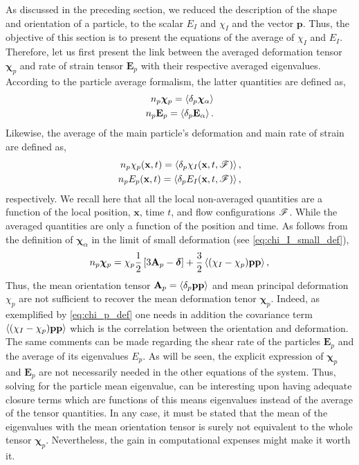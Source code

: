 As discussed in the preceding section, we reduced the description of the shape and orientation of a particle, to the scalar $E_I$ and $\chi_I$ and the vector $\textbf{p}$. 
Thus, the objective of this section is to present the equations of the average of $\chi_I$ and $E_I$. 
Therefore, let us first present the link between the averaged deformation tensor $\bm\chi_p$ and rate of strain tensor $\textbf{E}_p$ with their respective averaged eigenvalues.
According to the particle average formalism, the latter quantities are defined as,
\begin{align*}
    n_p \bm\chi_p = \left<\delta_p \bm\chi_\alpha\right>\\
    n_p \textbf{E}_p = \left<\delta_p \textbf{E}_\alpha\right>.
\end{align*}
Likewise, the average of the main particle's deformation and main rate of strain are defined as, 
\begin{align*}
    n_p \chi_p(\textbf{x},t) = \left<\delta_p \chi_I(\textbf{x},t,\mathscr{F})\right>,\\
    n_p E_p(\textbf{x},t) = \left<\delta_p E_I(\textbf{x},t,\mathscr{F})\right>,
\end{align*}
respectively. 
We recall here that all the local non-averaged quantities are a function of the local position, $\textbf{x}$, time $t$, and flow configurations $\mathscr{F}$. 
While the averaged quantities are only a function of the position and time. 
As follows from the definition of $\bm\chi_\alpha$ in the limit of small  deformation (see \ref{eq:chi_I_small_def}),  
\begin{equation}
    n_p \bm\chi_p
    = \chi_p
    \frac{1}{2}\left[
        3\textbf{A}_p 
        - \bm\delta
    \right]
    + \frac{3}{2}\avg{(\chi_I - \chi_p) \textbf{pp} }, 
    \label{eq:chi_p_def}
\end{equation}
Thus, the mean orientation tensor $\textbf{A}_p = \left<\delta_p \textbf{pp}\right>$ and mean principal deformation $\chi_p$ are not sufficient to recover the mean deformation tenor $\bm\chi_p$.
Indeed, as exemplified by \ref{eq:chi_p_def} one needs in addition the covariance term $\left<(\chi_I - \chi_p) \textbf{pp} \right>$ which is the correlation between the orientation and deformation. 
The same comments can be made regarding the shear rate of the particles $\textbf{E}_p$ and the average of its eigenvalues $E_p$. 
As will be seen, the explicit expression of $\bm\chi_p$ and $\textbf{E}_p$ are not necessarily needed in the other equations of the system. 
Thus, solving for the particle mean eigenvalue, can be interesting upon having adequate closure terms which are functions of this means eigenvalues instead of the average of the tensor quantities.
In any case, it must be stated that the mean of the eigenvalues with the mean orientation tensor is surely not equivalent to the whole tensor $\bm\chi_p$. 
Nevertheless, the gain in computational expenses might make it worth it. 

